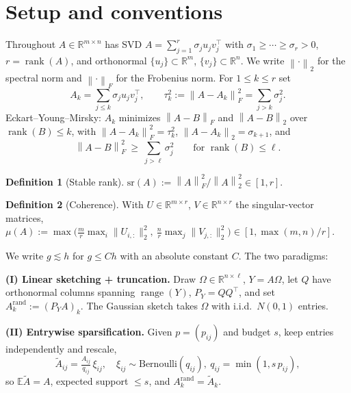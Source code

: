 \documentclass{amsart}
\theoremstyle{definition}
\newtheorem{definition}{Definition}
\DeclareMathOperator{\rank}{rank}
\DeclareMathOperator{\range}{range}
\newcommand{\R}{\mathbb{R}}
\newcommand{\Frob}[1]{\left\lVert #1\right\rVert_F}
\newcommand{\Op}[1]{\left\lVert #1\right\rVert_2}
\newcommand{\Atil}{\widetilde{A}}
\newcommand{\E}{\mathbb{E}}
\begin{document}
\section{Setup and conventions}\label{sec:setup}

Throughout $A\in\R^{m\times n}$ has SVD $A=\sum_{j=1}^{r}\sigma_j u_j v_j^{\top}$
with $\sigma_1\ge\cdots\ge\sigma_r>0$, $r=\rank(A)$, and orthonormal
$\{u_j\}\subset\R^m$, $\{v_j\}\subset\R^n$. We write $\Op{\cdot}$ for the
spectral norm and $\Frob{\cdot}$ for the Frobenius norm. For $1\le k\le r$ set
\begin{equation}\label{eq:partition}
A_k=\sum_{j\le k}\sigma_j u_j v_j^\top,\qquad
\tau_k^2:=\Frob{A-A_k}^2=\sum_{j>k}\sigma_j^2 .
\end{equation}
Eckart--Young--Mirsky: $A_k$ minimizes $\Frob{A-B}$ and $\Op{A-B}$ over
$\rank(B)\le k$, with $\Frob{A-A_k}^2=\tau_k^2$, $\Op{A-A_k}=\sigma_{k+1}$, and
\begin{equation}\label{eq:EY}
\Frob{A-B}^2\ \ge\ \sum_{j>\ell}\sigma_j^2\qquad\text{for }\rank(B)\le\ell.
\end{equation}

\begin{definition}[Stable rank]\label{def:srank}
$\mathrm{sr}(A):=\Frob{A}^2/\Op{A}^2\in[1,r]$.
\end{definition}
\begin{definition}[Coherence]\label{def:coh}
With $U\in\R^{m\times r}$, $V\in\R^{n\times r}$ the singular-vector matrices,
$\mu(A):=\max\big(\tfrac{m}{r}\max_i\|U_{i,:}\|_2^2,\
\tfrac{n}{r}\max_j\|V_{j,:}\|_2^2\big)\in[1,\max(m,n)/r]$.
\end{definition}

We write $g\lesssim h$ for $g\le Ch$ with an absolute constant $C$. The two
paradigms:

\smallskip
\noindent\textbf{(I) Linear sketching + truncation.} Draw
$\Omega\in\R^{n\times\ell}$, $Y=A\Omega$, let $Q$ have orthonormal columns
spanning $\range(Y)$, $P_Y=QQ^\top$, and set $A_k^{\mathrm{rand}}:=(P_YA)_k$.
The Gaussian sketch takes $\Omega$ with i.i.d.\ $N(0,1)$ entries.

\smallskip
\noindent\textbf{(II) Entrywise sparsification.} Given $p=(p_{ij})$ and budget
$s$, keep entries independently and rescale,
\begin{equation}\label{eq:entrywise}
\Atil_{ij}=\tfrac{A_{ij}}{q_{ij}}\,\xi_{ij},\quad
\xi_{ij}\sim\mathrm{Bernoulli}(q_{ij}),\ q_{ij}=\min(1,s\,p_{ij}),
\end{equation}
so $\E\Atil=A$, expected support $\le s$, and $A_k^{\mathrm{rand}}=\Atil_k$.
\end{document}

